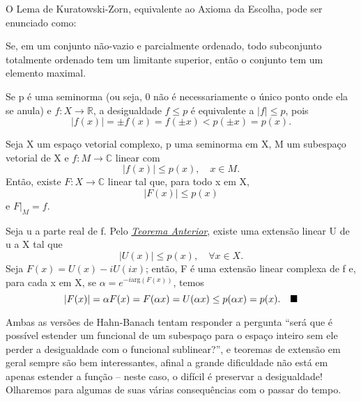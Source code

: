 \documentclass[../functional_analysis.tex]{subfiles}
\begin{document}
\begin{tcolorbox}[
		skin=enhanced,
		title=Lembrete!,
		after title={\hfill Lema de Zorn},
		fonttitle=\bfseries,
		sharp corners=downhill,
		colframe=black,
		colbacktitle=yellow!75!white,
		colback=yellow!30,
		colbacklower=black,
		coltitle=black,
		drop large lifted shadow
	]
	O \hypertarget{zorn_lemma}{Lema de Kuratowski-Zorn}, equivalente ao Axioma da Escolha, pode ser enunciado como:
	\begin{lemma*}
		Se, em um conjunto não-vazio e parcialmente ordenado, todo subconjunto totalmente ordenado tem um limitante superior, então o conjunto tem um elemento maximal.
	\end{lemma*}
\end{tcolorbox}

Se p é uma seminorma (ou seja, 0 não é necessariamente o único ponto onde ela se anula) e \(f:X\rightarrow \mathbb{R}\), a desigualdade \(f\leq p\) é equivalente a \(|f|\leq p\), pois
\[
	|f(x)| = \pm f(x)= f(\pm x)< p(\pm x) = p(x).
\]

\hypertarget{complex_hahn_banach}{
	\begin{theorem*}
		Seja X um espaço vetorial complexo, p uma seminorma em X, M um subespaço vetorial de X e \(f:M\rightarrow \mathbb{C}\) linear com
		\[
			|f(x)|\leq p(x),\quad x\in M.
		\]
		Então, existe \(F:X\rightarrow \mathbb{C}\) linear tal que, para todo x em X,
		\[
			|F(x)|\leq p(x)
		\]
		e \(F|_{M}=f.\)
	\end{theorem*}
}
\begin{proof*}
	Seja u a parte real de f. Pelo \hyperlink{hahn_banach}{\textit{Teorema Anterior}}, existe uma extensão linear U de u a X tal que
	\[
		|U(x)|\leq p(x),\quad \forall x\in X.
	\]
	Seja \(F(x)=U(x)-iU(ix)\); então, F é uma extensão linear complexa de f e, para cada x em X, se \(\alpha =e^{-i \mathrm{arg}(F(x))}\), temos
	\[
		|F(x)|=\alpha F(x)=F(\alpha x)=U(\alpha x)\leq p(\alpha x)=p(x).\quad \text{$\blacksquare$}
	\]
\end{proof*}

Ambas as versões de Hahn-Banach tentam responder a pergunta ``será que é possível estender um funcional de um subespaço para o espaço inteiro sem ele perder a desigualdade com o funcional sublinear?'', e teoremas de extensão em geral sempre são bem interessantes, afinal a grande dificuldade não está em apenas estender a função -- neste caso, o difícil é preservar a desigualdade! Olharemos para algumas de suas várias consequências com o passar do tempo.
\end{document}
